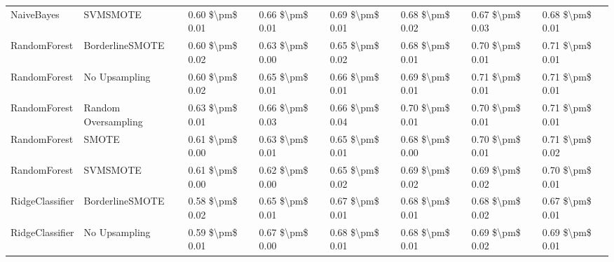 \begin{tabular}{llllllll}
                     NaiveBayes &                      SVMSMOTE & 0.60 \$\textbackslash pm\$ 0.01 &           0.66 \$\textbackslash pm\$ 0.01 &       0.69 \$\textbackslash pm\$ 0.01 &        0.68 \$\textbackslash pm\$ 0.02 &                         0.67 \$\textbackslash pm\$ 0.03 &     0.68 \$\textbackslash pm\$ 0.01 \\
                   RandomForest &               BorderlineSMOTE & 0.60 \$\textbackslash pm\$ 0.02 &           0.63 \$\textbackslash pm\$ 0.00 &       0.65 \$\textbackslash pm\$ 0.02 &        0.68 \$\textbackslash pm\$ 0.01 &                         0.70 \$\textbackslash pm\$ 0.01 &     0.71 \$\textbackslash pm\$ 0.01 \\
                   RandomForest &                 No Upsampling & 0.60 \$\textbackslash pm\$ 0.02 &           0.65 \$\textbackslash pm\$ 0.01 &       0.66 \$\textbackslash pm\$ 0.01 &        0.69 \$\textbackslash pm\$ 0.01 &                         0.71 \$\textbackslash pm\$ 0.01 &     0.71 \$\textbackslash pm\$ 0.01 \\
                   RandomForest &           Random Oversampling & 0.63 \$\textbackslash pm\$ 0.01 &           0.66 \$\textbackslash pm\$ 0.03 &       0.66 \$\textbackslash pm\$ 0.04 &        0.70 \$\textbackslash pm\$ 0.01 &                         0.70 \$\textbackslash pm\$ 0.01 &     0.71 \$\textbackslash pm\$ 0.01 \\
                   RandomForest &                         SMOTE & 0.61 \$\textbackslash pm\$ 0.00 &           0.63 \$\textbackslash pm\$ 0.01 &       0.65 \$\textbackslash pm\$ 0.01 &        0.68 \$\textbackslash pm\$ 0.00 &                         0.70 \$\textbackslash pm\$ 0.01 &     0.71 \$\textbackslash pm\$ 0.02 \\
                   RandomForest &                      SVMSMOTE & 0.61 \$\textbackslash pm\$ 0.00 &           0.62 \$\textbackslash pm\$ 0.00 &       0.65 \$\textbackslash pm\$ 0.02 &        0.69 \$\textbackslash pm\$ 0.02 &                         0.69 \$\textbackslash pm\$ 0.02 &     0.70 \$\textbackslash pm\$ 0.01 \\
                RidgeClassifier &               BorderlineSMOTE & 0.58 \$\textbackslash pm\$ 0.02 &           0.65 \$\textbackslash pm\$ 0.01 &       0.67 \$\textbackslash pm\$ 0.01 &        0.68 \$\textbackslash pm\$ 0.01 &                         0.68 \$\textbackslash pm\$ 0.02 &     0.67 \$\textbackslash pm\$ 0.01 \\
                RidgeClassifier &                 No Upsampling & 0.59 \$\textbackslash pm\$ 0.01 &           0.67 \$\textbackslash pm\$ 0.00 &       0.68 \$\textbackslash pm\$ 0.01 &        0.68 \$\textbackslash pm\$ 0.01 &                         0.69 \$\textbackslash pm\$ 0.02 &     0.69 \$\textbackslash pm\$ 0.01 \\

\end{tabular}
